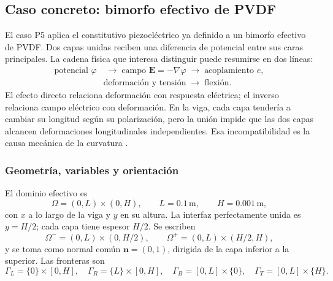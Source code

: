 %

\subsection{Caso concreto: bimorfo efectivo de PVDF}
\label{subsec:piezo-bimorfo-expansion}

El caso P5 aplica el constitutivo piezoeléctrico ya definido a un bimorfo
efectivo de PVDF. Dos capas unidas reciben una diferencia de potencial entre
sus caras principales. La cadena física que interesa distinguir puede resumirse
en dos líneas:
\[
  \begin{aligned}
  \text{potencial }\varphi
    &\;\longrightarrow\;\text{campo }\mathbf E=-\nabla\varphi
    \;\longrightarrow\;\text{acoplamiento }e,\\[-.2ex]
  &\text{deformación y tensión}
    \;\longrightarrow\;\text{flexión}.
  \end{aligned}
\]
El efecto directo relaciona deformación con respuesta eléctrica; el inverso
relaciona campo eléctrico con deformación. En la viga, cada capa tendería a
cambiar su longitud según su polarización, pero la unión impide que las dos
capas alcancen deformaciones longitudinales independientes. Esa incompatibilidad
es la causa mecánica de la curvatura \cite{khan2018bimorph,lahmer2008}.

\subsubsection{Geometría, variables y orientación}

El dominio efectivo es
\[
  \Omega=(0,L)\times(0,H),\qquad
  L=0.1\,\mathrm{m},\qquad H=0.001\,\mathrm{m},
\]
con $x$ a lo largo de la viga y $y$ en su altura. La interfaz perfectamente
unida es $y=H/2$; cada capa tiene espesor $H/2$. Se escriben
\[
  \Omega^-=(0,L)\times(0,H/2),\qquad
  \Omega^+=(0,L)\times(H/2,H),
\]
y se toma como normal común $\boldsymbol n=(0,1)$, dirigida de la capa
inferior a la superior. Las fronteras son
\[
  \Gamma_L=\{0\}\times[0,H],\quad
  \Gamma_R=\{L\}\times[0,H],\quad
  \Gamma_B=[0,L]\times\{0\},\quad
  \Gamma_T=[0,L]\times\{H\}.
\]

